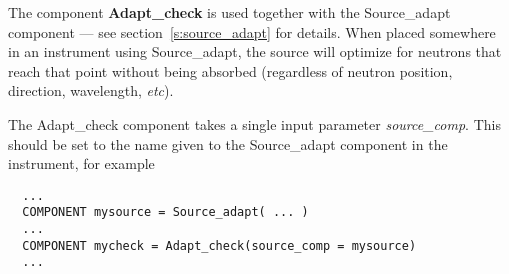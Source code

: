 The component {\bf Adapt\_check} is used together with the Source\_adapt
component --- see section~\ref{s:source_adapt} for details. When placed
somewhere in an instrument using Source\_adapt, the source will optimize
for neutrons that reach that point without being absorbed (regardless of
neutron position, direction, wavelength, \textit{etc}).

The Adapt\_check component takes a single input parameter
\textit{source\_comp}. This should be set to the name given to the
Source\_adapt component in the instrument, for example
\begin{verbatim}
  ...
  COMPONENT mysource = Source_adapt( ... )
  ...
  COMPONENT mycheck = Adapt_check(source_comp = mysource)
  ...
\end{verbatim}


